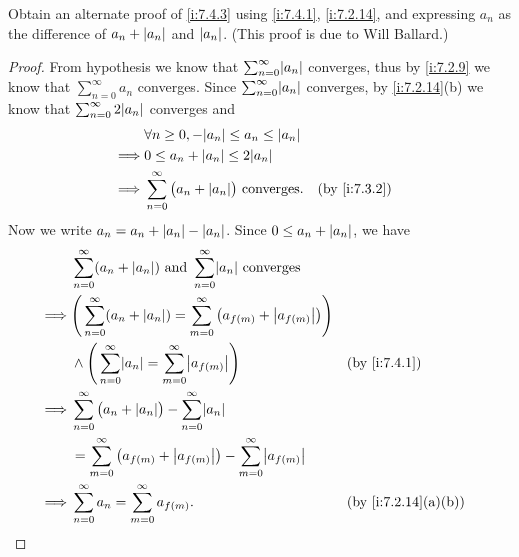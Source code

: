 \begin{ex}\label{i:ex:7.4.2}
  Obtain an alternate proof of \cref{i:7.4.3} using \cref{i:7.4.1}, \cref{i:7.2.14}, and expressing \(a_n\) as the difference of \(a_n + \left\lvert a_n\right\rvert\) and \(\left\lvert a_n\right\rvert\).
  (This proof is due to Will Ballard.)
\end{ex}

\begin{proof}
  From hypothesis we know that \(\sum_{n = 0}^\infty \abs{a_n}\) converges, thus by \cref{i:7.2.9} we know that \(\sum_{n = 0}^\infty a_n\) converges.
  Since \(\sum_{n = 0}^\infty \abs{a_n}\) converges, by \cref{i:7.2.14}(b) we know that \(\sum_{n = 0}^\infty 2 \abs{a_n}\) converges and
  \begin{align*}
             & \forall n \geq 0, -\abs{a_n} \leq a_n \leq \abs{a_n}                               \\
    \implies & 0 \leq a_n + \abs{a_n} \leq 2\abs{a_n}                                             \\
    \implies & \sum_{n = 0}^\infty \big(a_n + \abs{a_n}\big) \text{ converges}. &  & \by{i:7.3.2}
  \end{align*}
  Now we write \(a_n = a_n + \left\lvert a_n\right\rvert - \left\lvert a_n\right\rvert\).
  Since \(0 \leq a_n + \left\lvert a_n\right\rvert\), we have
  \begin{align*}
             & \sum_{n = 0}^\infty (a_n + \abs{a_n}) \text{ and } \sum_{n = 0}^\infty \abs{a_n} \text{ converges}                                  \\
    \implies & \Bigg(\sum_{n = 0}^\infty (a_n + \abs{a_n}) = \sum_{m = 0}^\infty \big(a_{f(m)} + \abs{a_{f(m)}}\big)\Bigg)                         \\
             & \land \Bigg(\sum_{n = 0}^\infty \abs{a_n} = \sum_{m = 0}^\infty \abs{a_{f(m)}}\Bigg)                        &  & \by{i:7.4.1}       \\
    \implies & \sum_{n = 0}^\infty \big(a_n + \abs{a_n}\big) - \sum_{n = 0}^\infty \abs{a_n}                                                       \\
             & = \sum_{m = 0}^\infty \big(a_{f(m)} + \abs{a_{f(m)}}\big) - \sum_{m = 0}^\infty \abs{a_{f(m)}}                                      \\
    \implies & \sum_{n = 0}^\infty a_n = \sum_{m = 0}^\infty a_{f(m)}.                                                     &  & \by{i:7.2.14}[a,b]
  \end{align*}
\end{proof}
